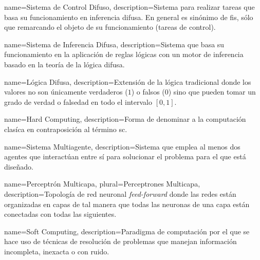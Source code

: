 

{
	name=Sistema de Control Difuso,
	description={Sistema para realizar tareas que basa su funcionamiento en inferencia difusa. En general es sinónimo de \gls{fis}, sólo que remarcando el objeto de su funcionamiento (tareas de control).}
}

{
	name=Sistema de Inferencia Difusa,
	description={Sistema que basa su funcionamiento en la aplicación de reglas lógicas con un motor de inferencia basado en la teoría de la lógica difusa.}
}

{
	name=Lógica Difusa,
	description={Extensión de la lógica tradicional donde los valores no son únicamente verdaderos ($1$) o falsos ($0$) sino que pueden tomar un grado de verdad o falsedad en todo el intervalo $[0, 1]$.}
}

{
	name=Hard Computing,
	description={Forma de denominar a la computación clasíca en contraposición al término \gls{sc}.}
}

{
	name=Sistema Multiagente,
	description={Sistema que emplea al menos dos agentes que interactúan entre sí para solucionar el problema para el que está diseñado.}
}

{
	name=Perceptrón Multicapa,
	plural=Perceptrones Multicapa,
	description={Topología de red neuronal \textit{feed-forward} donde las redes están organizadas en capas de tal manera que todas las neuronas de una capa están conectadas con todas las siguientes.}
}

{
	name={Soft Computing},
	description={Paradigma de computación por el que se hace uso de técnicas de resolución de problemas que manejan información incompleta, inexacta o con ruido.}
}


